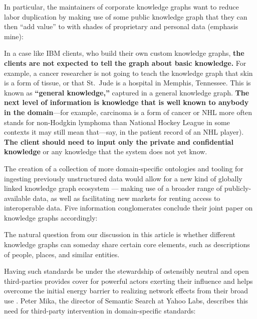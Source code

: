 In particular, the maintainers of corporate knowledge graphs want to
reduce labor duplication by making use of some public knowledge graph
that they can then ``add value'' to with shades of proprietary and
personal data (emphasis mine):

\begin{leftbar}
In a case like IBM clients, who build their own custom knowledge graphs,
\textbf{the clients are not expected to tell the graph about basic
knowledge.} For example, a cancer researcher is not going to teach the
knowledge graph that skin is a form of tissue, or that St.~Jude is a
hospital in Memphis, Tennessee. This is known as \textbf{``general
knowledge,''} captured in a general knowledge graph. \textbf{The next
level of information is knowledge that is well known to anybody in the
domain}---for example, carcinoma is a form of cancer or NHL more often
stands for non-Hodgkin lymphoma than National Hockey League in some
contexts it may still mean that---say, in the patient record of an NHL
player). \textbf{The client should need to input only the private and
confidential knowledge} or any knowledge that the system does not yet
know. \cite{noyIndustryscaleKnowledgeGraphs2019} 
\end{leftbar}

The creation of a collection of more domain-specific ontologies and
tooling for ingesting previously unstructured data would allow for a new
kind of globally linked knowledge graph ecosystem --- making use of a
broader range of publicly-available data, as well as facilitating new
markets for renting access to interoperable data. Five information
conglomerates conclude their joint paper on knowledge graphs
accordingly:

\begin{leftbar}
The natural question from our discussion in this article is whether
different knowledge graphs can someday share certain core elements, such
as descriptions of people, places, and similar entities. \cite{noyIndustryscaleKnowledgeGraphs2019} 
\end{leftbar}

Having such standards be under the stewardship of ostensibly neutral and
open third-parties provides cover for powerful actors exerting their
influence and helps overcome the initial energy barrier to realizing
network effects from their broad use \cite{wiegmannMultiModeStandardisationCritical2017, heiresInternationalOrganizationStandardization2008} . Peter Mika, the
director of Semantic Search at Yahoo Labs, describes this need for
third-party intervention in domain-specific standards:

